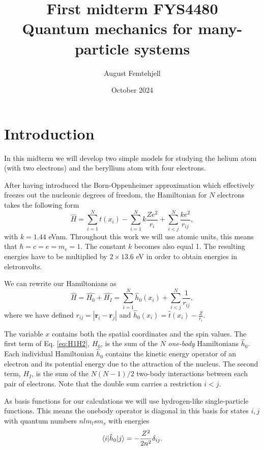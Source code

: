 \documentclass{article}
\title{
    First midterm FYS4480\\
    Quantum mechanics for many-particle systems
}
\author{August Femtehjell}
\date{October 2024}
\DeclarePairedDelimiter\bra{\langle}{\rvert}
\DeclarePairedDelimiter\ket{\lvert}{\rangle}
\begin{document}
\maketitle

\section*{Introduction}

In this midterm we will develop two simple models for studying the helium atom (with two electrons) and the beryllium atom with four electrons.

After having introduced the  Born-Oppenheimer approximation which effectively freezes out the nucleonic degrees of freedom, the Hamiltonian for $N$ electrons takes the following form
\begin{equation*}
  \hat{H} = \sum_{i=1}^{N} t(x_i) - \sum_{i=1}^{N} k\frac{Ze^2}{r_i} + \sum_{i<j}^{N} \frac{ke^2}{r_{ij}},
\end{equation*}
with $k=1.44$ eVnm.
Throughout this work we will use atomic units, this means that $\hbar = c = e = m_e = 1$.
The constant $k$ becomes also equal 1. 
The resulting energies have to be multiplied by $2 \times 13.6$ eV in order to obtain energies in eletronvolts.

We can rewrite our Hamiltonians as
\begin{equation}
    \hat{H} = \hat{H_0} + \hat{H_I} 
    = \sum_{i=1}^{N}\hat{h}_0(x_i) + \sum_{i<j}^{N}\frac{1}{r_{ij}},
\label{eq:H1H2}
\end{equation}
where  we have defined $r_{ij} = |\bm{r}_i - \bm{r}_j|$ and $\hat{h}_0(x_i) =  \hat{t}(x_i) - \frac{Z}{r_i}$.

The variable $x$ contains both the spatial coordinates and the spin
values.
The first term of Eq. \eqref{eq:H1H2}, $H_0$, is the sum of the $N$ \emph{one-body} Hamiltonians $\hat{h}_0$.
Each individual Hamiltonian $\hat{h}_0$ contains the kinetic energy operator of an electron and
its potential energy due to the attraction of the nucleus.
The second term, $H_I$, is the sum of the $N(N-1)/2$ two-body interactions between each pair of electrons.
Note that the double sum carries a
restriction $i<j$.

As basis functions for our calculations we will use hydrogen-like single-particle functions.
This means the onebody operator is diagonal in this basis for states $i,j$ with quantum numbers
$nlm_lsm_s$ with energies
\begin{equation*}
    \bra{i} \hat{h}_0 \ket{j} = -\frac{Z^2}{2n^2}\delta_{ij}.
\end{equation*}
\end{document}
